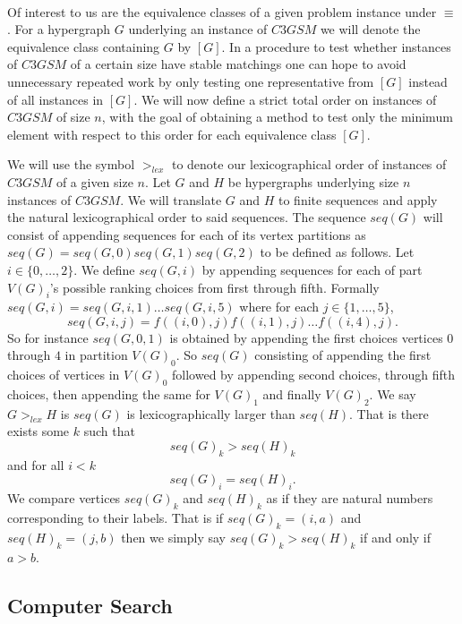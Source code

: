 \paragraph{}
Of interest to us are the equivalence classes of a given problem instance under $\equiv$. For a hypergraph $G$ underlying an instance of $C3GSM$ we will denote the equivalence class containing $G$ by $[G]$. In a procedure to test whether instances of $C3GSM$ of a certain size have stable matchings one can hope to avoid unnecessary repeated work by only testing one representative from $[G]$ instead of all instances in $[G]$. We will now define a strict total order on instances of $C3GSM$ of size $n$, with the goal of obtaining a method to test only the minimum element with respect to this order for each equivalence class $[G]$.
\begin{definition}
We will use the symbol $>_{lex}$ to denote our lexicographical order of instances of $C3GSM$ of a given size $n$. Let $G$ and $H$ be hypergraphs underlying size $n$ instances of $C3GSM$. We will translate $G$ and $H$ to finite sequences and apply the natural lexicographical order to said sequences. The sequence $seq(G)$ will consist of appending sequences for each of its vertex partitions as $seq(G) = seq(G,0)seq(G,1)seq(G,2)$ to be defined as follows. Let $i \in \{0,\dots, 2\}$.  We define $seq(G,i)$ by appending sequences for each of part $V(G)_i$'s possible ranking choices from first through fifth. Formally $seq(G,i) = seq(G,i,1)\dots seq(G,i,5)$ where for each $j \in \{1,\dots, 5\}$,
$$seq(G,i,j) = f((i,0),j)f((i,1),j)\dots f((i,4),j).$$
So for instance $seq(G,0, 1)$ is obtained by appending the first choices vertices $0$ through $4$ in partition $V(G)_0$. So $seq(G)$ consisting of appending the first choices of vertices in $V(G)_0$ followed by appending second choices, through fifth choices, then appending the same for $V(G)_1$ and finally $V(G)_2$.
We say $G >_{lex} H$ is $seq(G)$ is lexicographically larger than $seq(H)$. That is there exists some $k$ such that
$$seq(G)_k > seq(H)_k$$
and for all $i < k$
$$seq(G)_i = seq(H)_i.$$
We compare vertices $seq(G)_k$ and $ seq(H)_k$ as if they are natural numbers corresponding to their labels. That is if $seq(G)_k = (i,a)$ and $seq(H)_k = (j,b)$ then we simply say $seq(G)_k > seq(H)_k$ if and only if $a>b$. 
\end{definition}
\subsection{Computer Search}\label{sec:computersearch}
